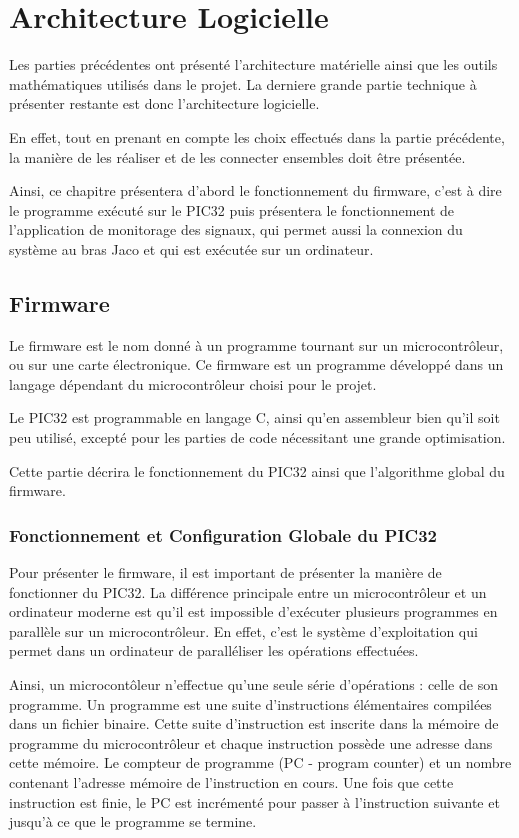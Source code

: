 \documentclass[letterpaper, twoside, 12pt, memoire, creativecommons, hyperref]{thETS}
\begin{document}
\section{Architecture Logicielle}

Les parties précédentes ont présenté l'architecture matérielle ainsi que les outils mathématiques utilisés dans le projet. La derniere grande partie technique à présenter restante est donc l'architecture logicielle. 

En effet, tout en prenant en compte les choix effectués dans la partie précédente, la manière de les réaliser et de les connecter ensembles doit être présentée. 

Ainsi, ce chapitre présentera d'abord le fonctionnement du firmware, c'est à dire le programme exécuté sur le PIC32 puis présentera le fonctionnement de l'application de monitorage des signaux, qui permet aussi la connexion du système au bras Jaco et qui est exécutée sur un ordinateur. 

\subsection{Firmware}

Le firmware est le nom donné à un programme tournant sur un microcontrôleur, ou sur une carte électronique. Ce firmware est un programme développé dans un langage dépendant du microcontrôleur choisi pour le projet. 

Le PIC32 est programmable en langage C, ainsi qu'en assembleur bien qu'il soit peu utilisé, excepté pour les parties de code nécessitant une grande optimisation. 

Cette partie décrira le fonctionnement du PIC32 ainsi que l'algorithme global du firmware. 

\subsubsection{Fonctionnement et Configuration Globale du PIC32}

Pour présenter le firmware, il est important de présenter la manière de fonctionner du PIC32. La différence principale entre un microcontrôleur et un ordinateur moderne est qu'il est impossible d'exécuter plusieurs programmes en parallèle sur un microcontrôleur. En effet, c'est le système d'exploitation qui permet dans un ordinateur de paralléliser les opérations effectuées. 

Ainsi, un microcontôleur n'effectue qu'une seule série d'opérations : celle de son programme. Un programme est une suite d'instructions élémentaires compilées dans un fichier binaire. Cette suite d'instruction est inscrite dans la mémoire de programme du microcontrôleur et chaque instruction possède une adresse dans cette mémoire. Le compteur de programme (PC - program counter) et un nombre contenant l'adresse mémoire de l'instruction en cours. Une fois que cette instruction est finie, le PC est incrémenté pour passer à l'instruction suivante et jusqu'à ce que le programme se termine. 
\end{document}

